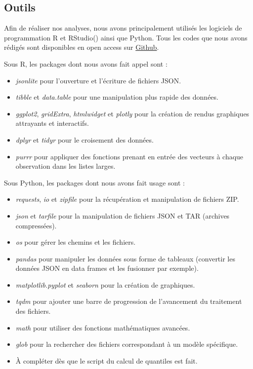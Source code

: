 \documentclass[a4paper,12pt]{article}
\begin{document}

\subsection{Outils}

Afin de réaliser nos analyses, nous avons principalement utilisés les logiciels de programmation R et RStudio(\cite{RStudio}) ainsi que Python. Tous les codes que nous avons rédigés sont disponibles en open access sur \href{https://github.com/lcletz/PLANTNET_M1_SSD}{Github}.

\vspace{0.2cm}

Sous R, les packages dont nous avons fait appel sont :
\begin{itemize}
    \item \textit{jsonlite} pour l'ouverture et l'écriture de fichiers JSON.
    \item \textit{tibble} et \textit{data.table} pour une manipulation plus rapide des données.
    \item \textit{ggplot2}, \textit{gridExtra}, \textit{htmlwidget} et \textit{plotly} pour la création de rendus graphiques attrayants et interactifs.
    \item \textit{dplyr} et \textit{tidyr} pour le croisement des données.
    \item \textit{purrr} pour appliquer des fonctions prenant en entrée des vecteurs à chaque observation dans les listes larges.
\end{itemize}

\vspace{0.2cm}

Sous Python, les packages dont nous avons fait usage sont :
\begin{itemize}
    \item \textit{requests}, \textit{io}  et \textit{zipfile} pour la récupération et manipulation de fichiers ZIP.
    \item \textit{json} et \textit{tarfile} pour la manipulation de fichiers JSON et TAR (archives compressées).
    \item \textit{os} pour gérer les chemins et les fichiers.
    \item \textit{pandas} pour manipuler les données sous forme de tableaux (convertir les données JSON en data frames et les fusionner par exemple).
    \item \textit{matplotlib.pyplot} et \textit{seaborn} pour la création de graphiques.
    \item \textit{tqdm} pour ajouter une barre de progression de l’avancement du traitement des fichiers.
    \item \textit{math} pour utiliser des fonctions mathématiques avancées.
    \item \textit{glob} pour la rechercher des fichiers correspondant à un modèle spécifique.
    \item À compléter dès que le script du calcul de quantiles est fait. 
\end{itemize}
\end{document}
